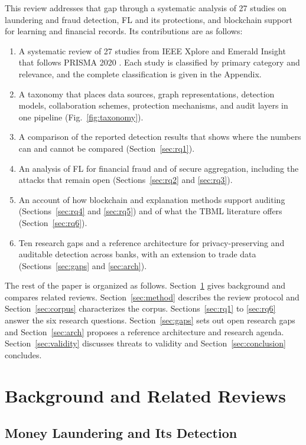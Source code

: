 \documentclass[journal]{IEEEtran}
\begin{document}
This review addresses that gap through a systematic analysis of 27 studies on laundering and fraud detection, FL and its protections, and blockchain support for learning and financial records. Its contributions are as follows:
\begin{enumerate}
\item A systematic review of 27 studies from IEEE Xplore and Emerald Insight that follows PRISMA 2020 \cite{page2021prisma}. Each study is classified by primary category and relevance, and the complete classification is given in the Appendix.
\item A taxonomy that places data sources, graph representations, detection models, collaboration schemes, protection mechanisms, and audit layers in one pipeline (Fig.~\ref{fig:taxonomy}).
\item A comparison of the reported detection results that shows where the numbers can and cannot be compared (Section~\ref{sec:rq1}).
\item An analysis of FL for financial fraud and of secure aggregation, including the attacks that remain open (Sections~\ref{sec:rq2} and \ref{sec:rq3}).
\item An account of how blockchain and explanation methods support auditing (Sections~\ref{sec:rq4} and \ref{sec:rq5}) and of what the TBML literature offers (Section~\ref{sec:rq6}).
\item Ten research gaps and a reference architecture for privacy-preserving and auditable detection across banks, with an extension to trade data (Sections~\ref{sec:gaps} and \ref{sec:arch}).
\end{enumerate}

The rest of the paper is organized as follows. Section~\ref{sec:background} gives background and compares related reviews. Section~\ref{sec:method} describes the review protocol and Section~\ref{sec:corpus} characterizes the corpus. Sections~\ref{sec:rq1} to \ref{sec:rq6} answer the six research questions. Section~\ref{sec:gaps} sets out open research gaps and Section~\ref{sec:arch} proposes a reference architecture and research agenda. Section~\ref{sec:validity} discusses threats to validity and Section~\ref{sec:conclusion} concludes.

\section{Background and Related Reviews}
\label{sec:background}

\subsection{Money Laundering and Its Detection}
\end{document}
